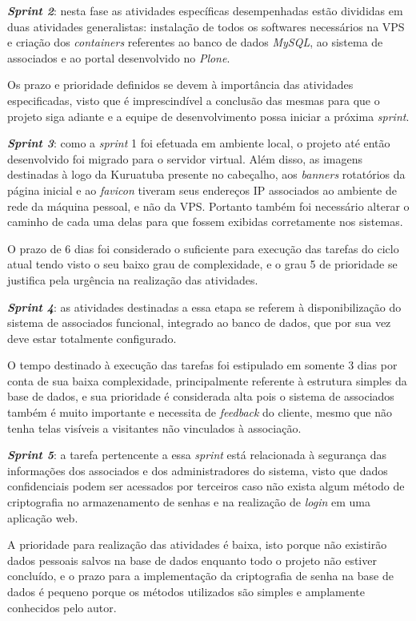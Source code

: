 \textbf{\textit{Sprint 2}}: nesta fase as atividades específicas desempenhadas estão divididas em duas atividades generalistas: instalação de todos os softwares necessários na VPS e criação dos \textit{containers} referentes ao banco de dados \textit{MySQL}, ao sistema de associados e ao portal desenvolvido no \textit{Plone}. 

Os prazo e prioridade definidos se devem à importância das atividades especificadas, visto que é imprescindível a conclusão das mesmas para que o projeto siga adiante e a equipe de desenvolvimento possa iniciar a próxima \textit{sprint}. 

\textbf{\textit{Sprint 3}}: como a \textit{sprint} 1 foi efetuada em ambiente local, o projeto até então desenvolvido foi migrado para o servidor virtual. Além disso, as imagens destinadas à logo da Kuruatuba presente no cabeçalho, aos \textit{banners} rotatórios da página inicial e ao \textit{favicon} tiveram seus endereços IP associados ao ambiente de rede da máquina pessoal, e não da VPS. Portanto também foi necessário alterar o caminho de cada uma delas para que fossem exibidas corretamente nos sistemas.

O prazo de 6 dias foi considerado o suficiente para execução das tarefas do ciclo atual tendo visto o seu baixo grau de complexidade, e o grau 5 de prioridade se justifica pela urgência na realização das atividades. 

\textbf{\textit{Sprint 4}}: as atividades destinadas a essa etapa se referem à disponibilização do sistema de associados funcional, integrado ao banco de dados, que por sua vez deve estar totalmente configurado. 

O tempo destinado à execução das tarefas foi estipulado em somente 3 dias por conta de sua baixa complexidade, principalmente referente à estrutura simples da base de dados, e sua prioridade é considerada alta pois o sistema de associados também é muito importante e necessita de \textit{feedback} do cliente, mesmo que não tenha telas visíveis a visitantes não vinculados à associação. 

\textbf{\textit{Sprint 5}}: a tarefa pertencente a essa \textit{sprint} está relacionada à segurança das informações dos associados e dos administradores do sistema, visto que dados confidenciais podem ser acessados por terceiros caso não exista algum método de criptografia no armazenamento de senhas e na realização de \textit{login} em uma aplicação web.

A prioridade para realização das atividades é baixa, isto porque não existirão dados pessoais salvos na base de dados enquanto todo o projeto não estiver concluído, e o prazo para a implementação da criptografia de senha na base de dados é pequeno porque os métodos utilizados são simples e amplamente conhecidos pelo autor.

